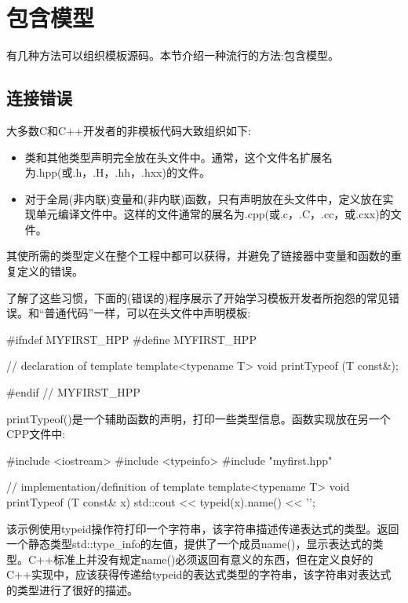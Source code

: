 \section{包含模型}


有几种方法可以组织模板源码。本节介绍一种流行的方法:包含模型。

\subsection{连接错误}

大多数C和C++开发者的非模板代码大致组织如下:

\begin{itemize}
\item
类和其他类型声明完全放在头文件中。通常，这个文件名扩展名为.hpp(或.h，.H，.hh，.hxx)的文件。

\item
对于全局(非内联)变量和(非内联)函数，只有声明放在头文件中，定义放在实现单元编译文件中。这样的文件通常的展名为.cpp(或.c，.C，.cc，或.cxx)的文件。
\end{itemize}

其使所需的类型定义在整个工程中都可以获得，并避免了链接器中变量和函数的重复定义的错误。

了解了这些习惯，下面的(错误的)程序展示了开始学习模板开发者所抱怨的常见错误。和“普通代码”一样，可以在头文件中声明模板:

\begin{cpp}
#ifndef MYFIRST_HPP
#define MYFIRST_HPP

// declaration of template
template<typename T>
void printTypeof (T const&);

#endif // MYFIRST_HPP
\end{cpp}

printTypeof()是一个辅助函数的声明，打印一些类型信息。函数实现放在另一个CPP文件中:

\begin{cpp}
#include <iostream>
#include <typeinfo>
#include "myfirst.hpp"

// implementation/definition of template
template<typename T>
void printTypeof (T const& x)
{
	std::cout << typeid(x).name() << ’\n’;
}
\end{cpp}

该示例使用typeid操作符打印一个字符串，该字符串描述传递表达式的类型。返回一个静态类型std::type\_info的左值，提供了一个成员name()，显示表达式的类型。C++标准上并没有规定name()必须返回有意义的东西，但在定义良好的C++实现中，应该获得传递给typeid的表达式类型的字符串，该字符串对表达式的类型进行了很好的描述。
 
